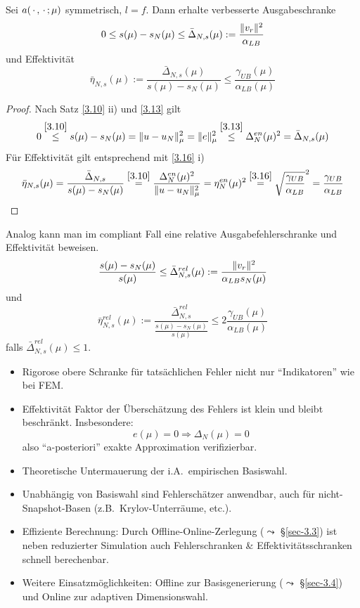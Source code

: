 \begin{satz} \label{3.18}
	Sei $a(\,\cdot\,,\,\cdot\,;\mu)$ symmetrisch, $l=f$. Dann erhalte verbesserte Ausgabeschranke
	\[
		0 \leq s(\mu) - s_N(\mu) \leq \bar \Delta_{N,s}(\mu) := \frac{\|v_r\|^2}{\alpha_{LB}}
	\]
	und Effektivität
	\[
		\bar\eta_{N,s}(\mu) := \frac{\bar\Delta_{N,s}(\mu)}{s(\mu)-s_N(\mu)} \leq \frac{\gamma_{UB}(\mu)}{\alpha_{LB}(\mu)}
	\]

	\begin{proof}
		Nach Satz \ref{3.10} ii) und \ref{3.13} gilt
		\[
			0 \stackrel{\ref{3.10}}{\leq} s(\mu)-s_N(\mu) = \|u-u_N\|_\mu^2 = \|e\|_\mu^2 \stackrel{\ref{3.13}}{\leq} \Delta_N^{en}(\mu)^2 = \bar\Delta_{N,s}(\mu)
		\]
		Für Effektivität gilt entsprechend mit \ref{3.16} i)
		\[
			\bar\eta_{N,s}(\mu) = \frac{\bar\Delta_{N,s}}{s(\mu)-s_N(\mu)} \stackrel{\ref{3.10}}{=} \frac{\Delta_N^{en}(\mu)^2}{\|u-u_N\|_\mu^2} = \eta_N^{en}(\mu)^2 \stackrel{\ref{3.16}}{=} \sqrt{\frac{\gamma_{UB}}{\alpha_{LB}}}^2 = \frac{\gamma_{UB}}{\alpha_{LB}}
		\]
	\end{proof}
\end{satz}

\begin{bem}
	Analog kann man im compliant Fall eine relative Ausgabefehlerschranke und Effektivität beweisen.
	\[
		\frac{s(\mu)-s_N(\mu)}{s(\mu)} \leq \bar\Delta_{N,s}^{rel}(\mu) := \frac{\|v_r\|^2}{\alpha_{LB} s_N(\mu)}
	\]
	und
	\[
		\bar\eta_{N,s}^{rel}(\mu) := \frac{\bar\Delta_{N,s}^{rel}}{\frac{s(\mu)-s_N(\mu)}{s(\mu)}} \leq 2 \frac{\gamma_{UB}(\mu)}{\alpha_{LB}(\mu)}
	\]
	falls $\bar\Delta_{N,s}^{rel}(\mu) \leq 1$.
\end{bem}

\begin{bem} \beginwithlistbem
	\begin{itemize}
		\item Rigorose obere Schranke für tatsächlichen Fehler nicht nur ``Indikatoren'' wie bei FEM.
		\item Effektivität Faktor der Überschätzung des Fehlers ist klein und bleibt beschränkt.
			Insbesondere:
			\[
				e(\mu) = 0 \Rightarrow \Delta_N(\mu) = 0
			\]
			also ``a-posteriori'' exakte Approximation verifizierbar.
		\item Theoretische Untermauerung der i.A.\ empirischen Basiswahl.
		\item Unabhängig von Basiswahl sind Fehlerschätzer anwendbar, auch für nicht-Snapshot-Basen (z.B.\ Krylov-Unterräume, etc.).
		\item Effiziente Berechnung: Durch Offline-Online-Zerlegung ($\leadsto$ §\ref{sec-3.3}) ist neben reduzierter Simulation auch Fehlerschranken \& Effektivitätsschranken schnell berechenbar.
		\item Weitere Einsatzmöglichkeiten: Offline zur Basisgenerierung ($\leadsto$ §\ref{sec-3.4}) und Online zur adaptiven Dimensionswahl.
	\end{itemize}
\end{bem}

